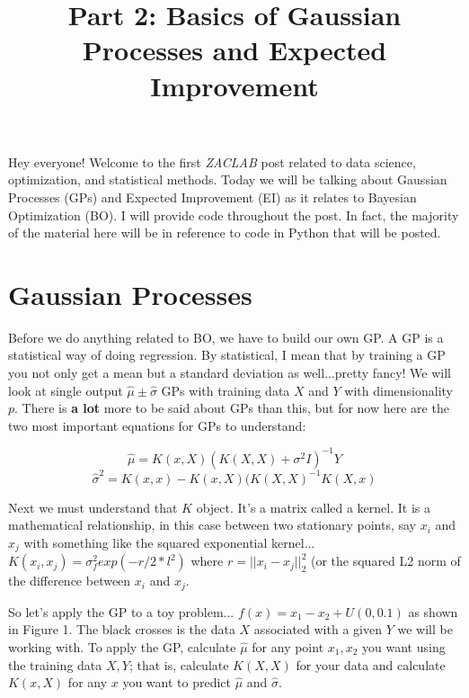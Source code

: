 \documentclass[12pt]{article}
\title{\textbf{Part 2: Basics of Gaussian Processes and Expected Improvement}}
\begin{document}
\maketitle

Hey everyone! Welcome to the first \emph{ZACLAB} post related to data science, optimization, and statistical methods. Today we will be talking about Gaussian Processes (GPs) and Expected Improvement (EI) as it relates to Bayesian Optimization (BO). I will provide code throughout the post. In fact, the majority of the material here will be in reference to code in Python that will be posted.

\section{Gaussian Processes}

Before we do anything related to BO, we have to build our own GP. A GP is a statistical way of doing regression. By statistical, I mean that by training a GP you not only get a mean but a standard deviation as well...pretty fancy! We will look at single output $\hat{\mu} \pm \hat{\sigma}$ GPs with training data $X$ and $Y$ with dimensionality $p$. There is \textbf{a lot} more to be said about GPs than this, but for now here are the two most important equations for GPs to understand:

\begin{equation}
\hat{\mu} = K(x,X)(K(X,X) + \sigma^{2}I)^{-1}Y
\end{equation}
\begin{equation}
\hat{\sigma}^{2} = K(x,x) - K(x,X)(K(X,X)^{-1}K(X,x)
\end{equation}

Next we must understand that $K$ object. It's a matrix called a kernel. It is a mathematical relationship, in this case between two stationary points, say $x_{i}$ and $x_{j}$ with something like the squared exponential kernel... $K(x_{i},x_{j}) = \sigma_{f}^{2}exp(-r/2*l^{2})$ where $r = ||x_{i}-x_{j}||_{2}^2$ (or the squared L2 norm of the difference between $x_{i}$ and $x_{j}$. 

\vspace{5mm}

So let's apply the GP to a toy problem... $f(x) = x_{1}-x_{2}+U(0,0.1)$ as shown in Figure 1. The black crosses is the data $X$ associated with a given $Y$ we will be working with. To apply the GP, calculate $\hat{\mu}$ for any point $x_1,x_2$ you want using the training data $X,Y$; that is, calculate $K(X,X)$ for your data and calculate $K(x,X)$ for any $x$ you want to predict $\hat{\mu}$ and $\hat{\sigma}$.
\end{document}
